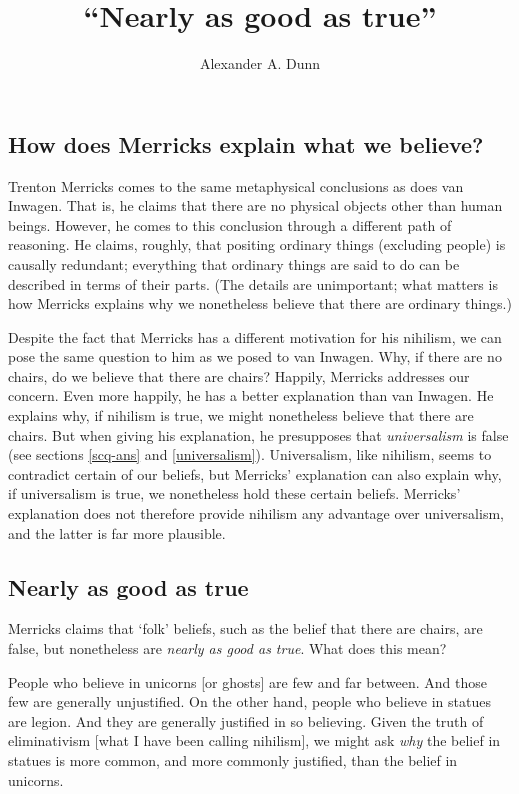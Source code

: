 \documentclass[11pt]{article}
\title{``Nearly as good as true''}
\author{Alexander A. Dunn}
\newenvironment{squote}{%
\begin{spacing}{1}
       	\begin{list}{}{%
\setlength{\labelwidth}{0pt}%
\rightmargin\leftmargin%
}
\item\relax
}{%
\end{list}%
\end{spacing}
}
\begin{document}
\ifstandalone
\maketitle
\begin{spacing}{1.25}
\fi

\section{How does Merricks explain what we believe?}
\label{universe}
\label{merricks}
Trenton Merricks comes to the same metaphysical conclusions as does
van Inwagen.  That is, he claims that there are no physical objects
other than human beings.  However, he comes to this conclusion through
a different path of reasoning.  He claims, roughly, that positing
ordinary things (excluding people) is causally redundant; everything
that ordinary things are said to do can be described in terms of their
parts. (The details are unimportant; what matters is how Merricks
explains why we nonetheless believe that there are ordinary things.)

Despite the fact that Merricks has a different motivation for his
nihilism, we can pose the same question to him as we posed to van
Inwagen.  Why, if there are no chairs, do we believe that there are
chairs?  Happily, Merricks addresses our concern.  Even more happily,
he has a better explanation than van Inwagen.  He explains why, if
nihilism is true, we might nonetheless believe that there are chairs.
But when giving his explanation, he presupposes that {\em
  universalism} is false (see sections \ref{scq-ans} and
\ref{universalism}).  Universalism, like nihilism, seems to contradict
certain of our beliefs, but Merricks' explanation can also explain
why, if universalism is true, we nonetheless hold these certain
beliefs.  Merricks' explanation does not therefore provide nihilism
any advantage over universalism, and the latter is far more plausible.

\subsection{Nearly as good as true}
\label{near}
Merricks claims that `folk' beliefs, such as the belief that there are
chairs, are false, but nonetheless are {\em nearly as good as true}.
What does this mean?

\begin{squote}
People who believe in unicorns [or ghosts] are few and far between.
And those few are generally unjustified.  On the other hand, people
who believe in statues are legion.  And they are generally justified
in so believing.  Given the truth of eliminativism [what I have been
  calling nihilism], we might ask {\em why} the belief in statues is
more common, and more commonly justified, than the belief in unicorns.


\end{squote}
\end{spacing}
\end{document}
